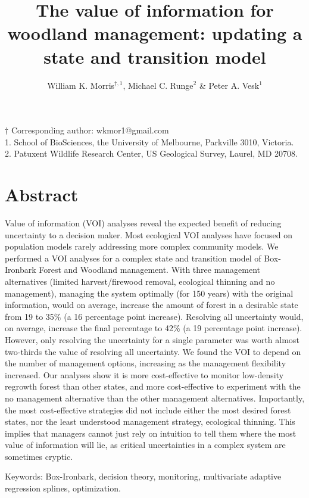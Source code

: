 \documentclass[draft]{article}
\title{The value of information for woodland management: updating a state and
transition model}
\author{William K. Morris\(^{\dagger,1}\), Michael C. Runge\(^2\) \& Peter A.
Vesk\(^1\)}
\date{}
\theoremstyle{definition}
\theoremstyle{definition}
\theoremstyle{definition}
\theoremstyle{remark}
\begin{document}
\maketitle

$\dagger$ Corresponding author: wkmor1@gmail.com\\
1. School of BioSciences, the University of Melbourne, Parkville 3010, Victoria.\\
2. Patuxent Wildlife Research Center, US Geological Survey, Laurel, MD 20708.

\newpage

\section*{Abstract}\label{abstract}

Value of information (VOI) analyses reveal the expected benefit of reducing uncertainty to a decision maker. Most ecological VOI analyses have focused on population models rarely addressing more complex community models. We performed a VOI analyses for a complex state and transition model of Box-Ironbark Forest and Woodland management. With three management alternatives (limited harvest/firewood removal, ecological thinning and no management), managing the system optimally (for 150 years) with the original information, would on average, increase the amount of forest in a desirable state from 19 to 35\% (a 16 percentage point increase). Resolving all uncertainty would, on average, increase the final percentage to 42\% (a 19 percentage point increase). However, only resolving the uncertainty for a single parameter was worth almost two-thirds the value of resolving all uncertainty. We found the VOI to depend on the number of management options, increasing as the management flexibility increased. Our analyses show it is more cost-effective to monitor low-density regrowth forest than other states, and more cost-effective to experiment with the no management alternative than the other management alternatives. Importantly, the most cost-effective strategies did not include either the most desired forest states, nor the least understood management strategy, ecological thinning. This implies that managers cannot just rely on intuition to tell them where the most value of information will lie, as critical uncertainties in a complex system are sometimes cryptic.

Keywords: Box-Ironbark, decision theory, monitoring, multivariate adaptive regression splines, optimization.
\end{document}

